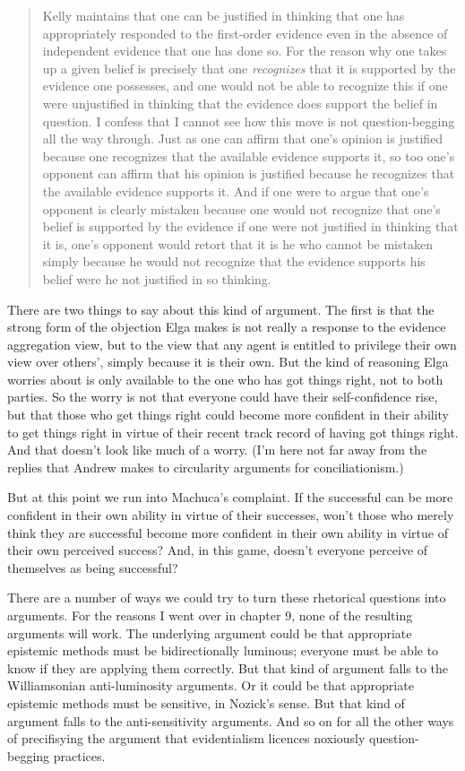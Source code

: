 \begin{quote}
Kelly maintains that one can be justified in thinking that one has appropriately responded to the first-order evidence even in the absence of independent evidence that one has done so. For the reason why one takes up a given belief is precisely that one \emph{recognizes} that it is supported by the evidence one possesses, and one would not be able to recognize this if one were unjustified in thinking that the evidence does support the belief in question. I confess that I cannot see how this move is not question-begging all the way through. Just as one can affirm that one's opinion is justified because one recognizes that the available evidence supports it, so too one's opponent can affirm that his opinion is justified because he recognizes that the available evidence supports it. And if one were to argue that one's opponent is clearly mistaken because one would not recognize that one's belief is supported by the evidence if one were not justified in thinking that it is, one's opponent would retort that it is he who cannot be mistaken simply because he would not recognize that the evidence supports his belief were he not justified in so thinking. ~\citep[77-78]{Machuca2013}
\end{quote}
There are two things to say about this kind of argument. The first is that the strong form of the objection Elga makes is not really a response to the evidence aggregation view, but to the view that any agent is entitled to privilege their own view over others', simply because it is their own. But the kind of reasoning Elga worries about is only available to the one who has got things right, not to both parties. So the worry is not that everyone could have their self-confidence rise, but that those who get things right could become more confident in their ability to get things right in virtue of their recent track record of having got things right. And that doesn't look like much of a worry. (I'm here not far away from the replies that Andrew \citet{Rotondo2013} makes to circularity arguments for conciliationism.)

But at this point we run into Machuca's complaint. If the successful can be more confident in their own ability in virtue of their successes, won't those who merely think they are successful become more confident in their own ability in virtue of their own perceived success? And, in this game, doesn't everyone perceive of themselves as being successful?

There are a number of ways we could try to turn these rhetorical questions into arguments. For the reasons I went over in chapter 9, none of the resulting arguments will work. The underlying argument could be that appropriate epistemic methods must be bidirectionally luminous; everyone must be able to know if they are applying them correctly. But that kind of argument falls to the Williamsonian anti-luminosity arguments. Or it could be that appropriate epistemic methods must be sensitive, in Nozick's sense. But that kind of argument falls to the anti-sensitivity arguments. And so on for all the other ways of precifisying the argument that evidentialism licences noxiously question-begging practices.

